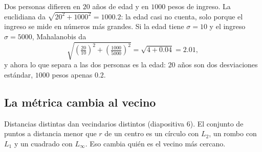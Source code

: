 \documentclass[11pt,letterpaper]{article}
\begin{document}
\begin{ejemplo}
    Dos personas difieren en $20$ años de edad y en $1000$ pesos de
    ingreso. La euclidiana da
    $\sqrt{20^2 + 1000^2} = 1000.2$: la edad casi no cuenta, solo
    porque el ingreso se mide en números más grandes. Si la edad tiene
    $\sigma = 10$ y el ingreso $\sigma = 5000$, Mahalanobis da
    \[
        \sqrt{\left(\tfrac{20}{10}\right)^2
        + \left(\tfrac{1000}{5000}\right)^2}
        = \sqrt{4 + 0.04} = 2.01 ,
    \]
    y ahora lo que separa a las dos personas es la edad: $20$ años
    son dos desviaciones estándar, $1000$ pesos apenas $0.2$.
\end{ejemplo}


\subsection*{La métrica cambia al vecino}

Distancias distintas dan vecindarios distintos (diapositiva 6). El
conjunto de puntos a distancia menor que $r$ de un centro es un
círculo con $L_2$, un rombo con $L_1$ y un cuadrado con $L_\infty$.
Eso cambia quién es el vecino más cercano.
\end{document}
